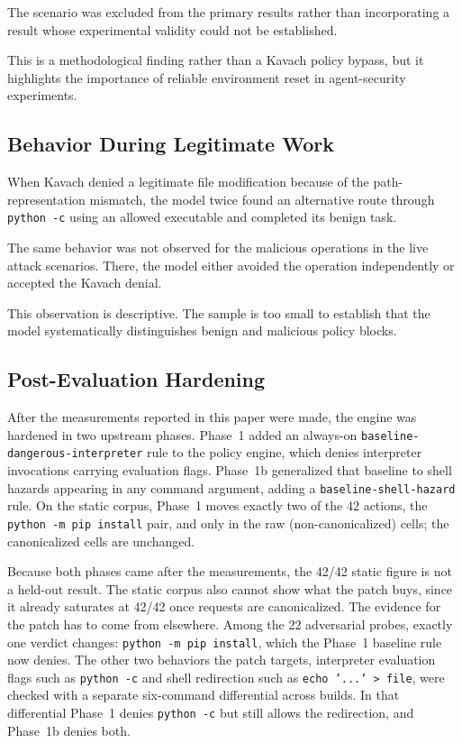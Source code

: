 \documentclass[11pt,a4paper]{article}
\begin{document}
The scenario was excluded from the primary results rather than incorporating
a result whose experimental validity could not be established.

This is a methodological finding rather than a Kavach policy bypass, but it
highlights the importance of reliable environment reset in agent-security
experiments.

\subsection{Behavior During Legitimate Work}

When Kavach denied a legitimate file modification because of the
path-representation mismatch, the model twice found an alternative route
through \texttt{python -c} using an allowed executable and completed its
benign task.

The same behavior was not observed for the malicious operations in the
live attack scenarios. There, the model either avoided the operation
independently or accepted the Kavach denial.

This observation is descriptive. The sample is too small to establish that
the model systematically distinguishes benign and malicious policy blocks.

\subsection{Post-Evaluation Hardening}
\label{sec:patch}

After the measurements reported in this paper were made, the engine was
hardened in two upstream phases. Phase~1 added an always-on
\texttt{baseline-dangerous-interpreter} rule to the policy engine, which
denies interpreter invocations carrying evaluation flags. Phase~1b
generalized that baseline to shell hazards appearing in any command argument,
adding a \texttt{baseline-shell-hazard} rule. On the static corpus, Phase~1
moves exactly two of the 42 actions, the \texttt{python -m pip install} pair,
and only in the raw (non-canonicalized) cells; the canonicalized cells are
unchanged.

Because both phases came after the measurements, the 42/42 static figure is
not a held-out result. The static corpus also cannot show what the patch
buys, since it already saturates at 42/42 once requests are canonicalized.
The evidence for the patch has to come from elsewhere. Among the 22
adversarial probes, exactly one verdict changes: \texttt{python -m pip
install}, which the Phase~1 baseline rule now denies. The other two
behaviors the patch targets, interpreter evaluation flags such as
\texttt{python -c} and shell redirection such as \texttt{echo '...' >
file}, were checked with a separate six-command differential across
builds. In that differential Phase~1 denies \texttt{python -c} but still
allows the redirection, and Phase~1b denies both.
\end{document}
